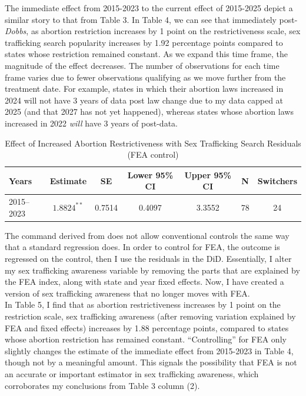 \documentclass[10pt]{article}
\begin{document}
The immediate effect from 2015-2023 to the current effect of 2015-2025 depict a similar story to that from Table 3. In Table 4, we can see that immediately post-\textit{Dobbs}, as abortion restriction increases by 1 point on the restrictiveness scale, sex trafficking search popularity increases by 1.92 percentage points compared to states whose restriction remained constant. As we expand this time frame, the magnitude of the effect decreases. The number of observations for each time frame varies due to fewer observations qualifying as we move further from the treatment date. For example, states in which their abortion laws increased in 2024 will not have 3 years of data post law change due to my data capped at 2025 (and that 2027 has not yet happened), whereas states whose abortion laws increased in 2022 \textit{will} have 3 years of post-data. 

\begin{table}[H]
\centering

\begin{tabular}{lcccccc}
\hline
Years & Estimate & SE & Lower 95\% CI & Upper 95\% CI & N & Switchers \\
\hline
2015--2023 & $1.8824^{**}$ & 0.7514 & 0.4097 & 3.3552 & 78 & 24 \\
\hline
\end{tabular}
\caption{Effect of Increased Abortion Restrictiveness with Sex Trafficking Search Residuals (FEA control)}
\end{table}
The command derived from \cite{diff2} does not allow conventional controls the same way that a standard regression does. In order to control for FEA, the outcome is regressed on the control, then I use the residuals in the \cite{diff2} DiD. Essentially, I alter my sex trafficking awareness variable by removing the parts that are explained by the FEA index, along with state and year fixed effects. Now, I have created a version of sex trafficking awareness that no longer moves with FEA. \\
\indent In Table 5, I find that as abortion restrictiveness increases by 1 point on the restriction scale, sex trafficking awareness (after removing variation explained by FEA and fixed effects) increases by 1.88 percentage points, compared to states whose abortion restriction has remained constant. ``Controlling'' for FEA only slightly changes the estimate of the immediate effect from 2015-2023 in Table 4, though not by a meaningful amount. This signals the possibility that FEA is not an accurate or important estimator in sex trafficking awareness, which corroborates my conclusions from Table 3 column (2).
\end{document}
